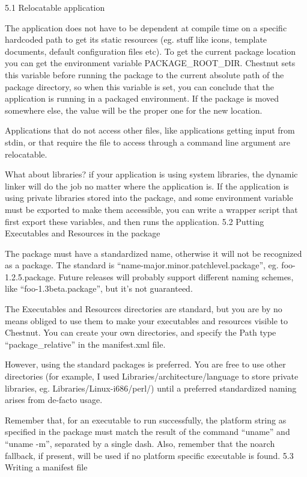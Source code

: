 5.1 Relocatable application

The application does not have to be dependent at compile time on a specific
hardcoded path to get its static resources (eg. stuff like icons, template
documents, default configuration files etc). To get the current package
location you can get the environment variable PACKAGE\_ROOT\_DIR. Chestnut sets
this variable before running the package to the current absolute path of the
package directory, so when this variable is set, you can conclude that the
application is running in a packaged environment. If the package is moved
somewhere else, the value will be the proper one for the new location.

Applications that do not access other files, like applications getting input from stdin, or that require the file to access through a command line argument are relocatable.

What about libraries? if your application is using system libraries, the dynamic linker will do the job no matter where the application is. If the application is using private libraries stored into the package, and some environment variable must be exported to make them accessible, you can write a wrapper script that first export these variables, and then runs the application.
5.2 Putting Executables and Resources in the package

The package must have a standardized name, otherwise it will not be recognized as a package. The standard is “name-major.minor.patchlevel.package”, eg. foo-1.2.5.package. Future releases will probably support different naming schemes, like “foo-1.3beta.package”, but it’s not guaranteed.

The Executables and Resources directories are standard, but you are by no means
obliged to use them to make your executables and resources visible to Chestnut.
You can create your own directories, and specify the Path type
“package\_relative” in the manifest.xml file.

However, using the standard packages is preferred. You are free to use other directories (for example, I used Libraries/architecture/language to store private libraries, eg. Libraries/Linux-i686/perl/) until a preferred standardized naming arises from de-facto usage.

Remember that, for an executable to run successfully, the platform string as specified in the package must match the result of the command “uname” and “uname -m”, separated by a single dash. Also, remember that the noarch fallback, if present, will be used if no platform specific executable is found.
5.3 Writing a manifest file

